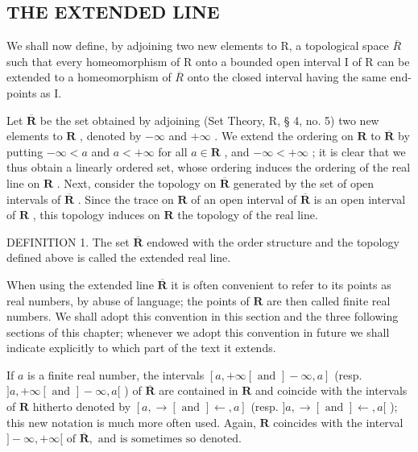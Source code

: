 \subsection{THE EXTENDED LINE}

We shall now define, by adjoining two new elements to R, a topological space \(\overline{R}\) such that every homeomorphism of R onto a bounded open interval I of R can be extended to a homeomorphism of \(\overline{R}\) onto the closed interval having the same end-points as I.

Let \(\overline{\mathbf{R}}\) be the set obtained by adjoining (Set Theory, R, § 4, no. 5) two new elements to \(\mathbf{R}\) , denoted by \(-\infty\) and \(+\infty\) . We extend the ordering on \(\mathbf{R}\) to \(\overline{\mathbf{R}}\) by putting \(-\infty < a\) and \(a < +\infty\) for all \(a \in \mathbf{R}\) , and \(-\infty < +\infty\) ; it is clear that we thus obtain a linearly ordered set, whose ordering induces the ordering of the real line on \(\mathbf{R}\) . Next, consider the topology on \(\overline{\mathbf{R}}\) generated by the set of open intervals of \(\overline{\mathbf{R}}\) . Since the trace on \(\mathbf{R}\) of an open interval of \(\overline{\mathbf{R}}\) is an open interval of \(\mathbf{R}\) , this topology induces on \(\mathbf{R}\) the topology of the real line.

DEFINITION 1. The set \(\overline{\mathbf{R}}\) endowed with the order structure and the topology defined above is called the extended real line.

When using the extended line \(\overline{\mathbf{R}}\) it is often convenient to refer to its points as real numbers, by abuse of language; the points of \(\mathbf{R}\) are then called finite real numbers. We shall adopt this convention in this section and the three following sections of this chapter; whenever we adopt this convention in future we shall indicate explicitly to which part of the text it extends.

If \(a\) is a finite real number, the intervals \([a, +\infty[ \text{ and } ] - \infty, a]\) (resp. \(]a, +\infty[ \text{ and } ] - \infty, a[\) ) of \(\overline{\mathbf{R}}\) are contained in \(\mathbf{R}\) and coincide with the intervals of \(\mathbf{R}\) hitherto denoted by \([a, \rightarrow[ \text{ and } ] \leftarrow, a]\) (resp. \(]a, \rightarrow[ \text{ and } ] \leftarrow, a[\) ); this new notation is much more often used. Again, \(\mathbf{R}\) coincides with the interval \(] - \infty, +\infty[ \text{ of } \overline{\mathbf{R}}, \text{ and is sometimes so denoted.}\)

